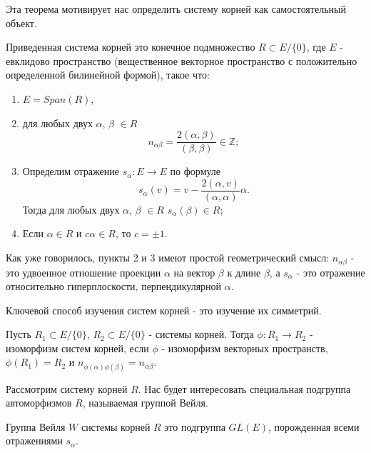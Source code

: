 \documentclass[a4article]{article}
\begin{document}
Эта теорема мотивирует нас определить систему корней как самостоятельный объект.

\begin{definition}
    Приведенная система корней это конечное подмножество $R \subset  E / \{0\}$, где $E$ - евклидово пространство (вещественное векторное пространство с положительно определенной билинейной формой), такое что:
    \begin{enumerate}
        \item $E=Span(R)$,
        \item для любых двух $\alpha$, $\beta$ $\in R$
        \begin{equation}
            n_{\alpha\beta} = \frac{2(\alpha, \beta)}{(\beta, \beta)} \in \mathbb{Z};
        \end{equation}
        \item Определим отражение $s_{\alpha}: E \rightarrow E$ по формуле
        \begin{equation}
            s_{\alpha}(v)=v - \frac{2(\alpha, v)}{(\alpha, \alpha)} \alpha.
        \end{equation}
        Тогда для любых двух $\alpha$, $\beta$ $\in R$ $s_{\alpha}(\beta) \in R$;
        \item Если $\alpha \in R$ и $c\alpha \in R$, то $c=\pm 1$.
    \end{enumerate}
\end{definition}
\begin{remark}
    Как уже говорилось, пункты 2 и 3 имеют простой геометрический смысл: $n_{\alpha \beta}$ - это удвоенное отношение проекции $\alpha$ на вектор $\beta$ к длине $\beta$, а $s_{\alpha}$ - это отражение относительно гиперплоскости, перпендикулярной $\alpha$.
\end{remark}
Ключевой способ изучения систем корней - это изучение их симметрий.
\begin{definition}
    Пусть $R_1 \subset E / \{0\}$, $R_2 \subset E / \{0\}$ - системы корней. Тогда $\phi: R_1 \rightarrow R_2$ - изоморфизм систем корней, если $\phi$ - изоморфизм векторных пространств, $\phi(R_1)=R_2$ и $n_{\phi(\alpha)\phi(\beta)}=n_{\alpha \beta}$.
\end{definition}
Рассмотрим систему корней $R$. Нас будет интересовать специальная подгруппа автоморфизмов $R$, называемая группой Вейля.
\begin{definition}
    Группа Вейля $W$ системы корней $R$ это подгруппа $GL(E)$, порожденная всеми отражениями $s_{\alpha}$.
\end{definition}
\end{document}
